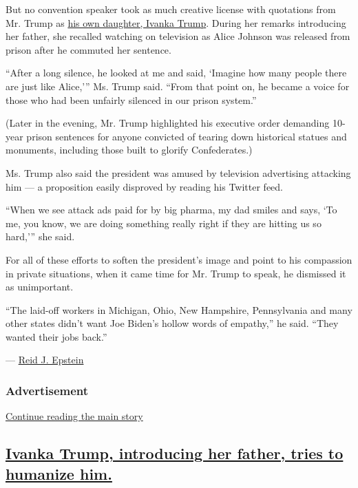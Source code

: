 But no convention speaker took as much creative license with quotations
from Mr. Trump as
\href{https://www.nytimes3xbfgragh.onion/live/2020/08/27/us/rnc-convention-election/ivanka-trump-introducing-her-father-tries-to-humanize-him}{his
own daughter, Ivanka Trump}. During her remarks introducing her father,
she recalled watching on television as Alice Johnson was released from
prison after he commuted her sentence.

``After a long silence, he looked at me and said, `Imagine how many
people there are just like Alice,''' Ms. Trump said. ``From that point
on, he became a voice for those who had been unfairly silenced in our
prison system.''

(Later in the evening, Mr. Trump highlighted his executive order
demanding 10-year prison sentences for anyone convicted of tearing down
historical statues and monuments, including those built to glorify
Confederates.)

Ms. Trump also said the president was amused by television advertising
attacking him --- a proposition easily disproved by reading his Twitter
feed.

``When we see attack ads paid for by big pharma, my dad smiles and says,
`To me, you know, we are doing something really right if they are
hitting us so hard,''' she said.

For all of these efforts to soften the president's image and point to
his compassion in private situations, when it came time for Mr. Trump to
speak, he dismissed it as unimportant.

``The laid-off workers in Michigan, Ohio, New Hampshire, Pennsylvania
and many other states didn't want Joe Biden's hollow words of empathy,''
he said. ``They wanted their jobs back.''

--- \href{https://www.nytimes3xbfgragh.onion/by/reid-j-epstein}{Reid J.
Epstein}

\hypertarget{advertisement-1}{%
\subsubsection{Advertisement}\label{advertisement-1}}

\protect\hyperlink{after-dfp-ad-mid2}{Continue reading the main story}

\hypertarget{ivanka-trump-introducing-her-father-tries-to-humanize-him}{%
\subsection{\texorpdfstring{\protect\hyperlink{ivanka-trump-introducing-her-father-tries-to-humanize-him}{Ivanka
Trump, introducing her father, tries to humanize
him.}}{Ivanka Trump, introducing her father, tries to humanize him.}}\label{ivanka-trump-introducing-her-father-tries-to-humanize-him}}

